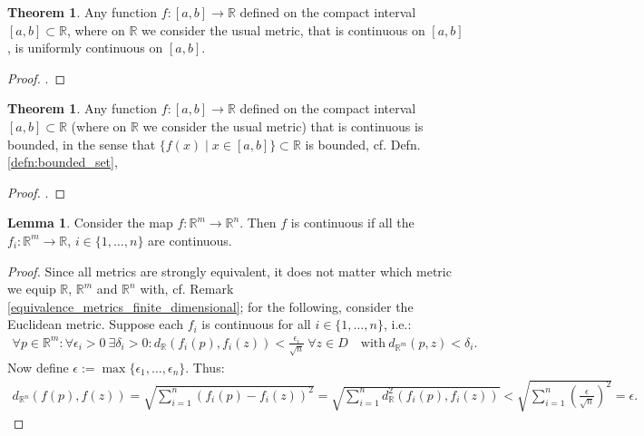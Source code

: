 \documentclass[12pt, a4paper]{article}
\numberwithin{equation}{section}
\theoremstyle{definition}
\theoremstyle{definition}
\newtheorem{lemma}[thm]{Lemma} %
\newtheorem{theorem}[thm]{Theorem}
\begin{document}
	\begin{theorem}\label{thrm:uniform_continuity}
		Any function $f: [a, b]\to\mathbb R$ defined on the compact interval \\ $[a, b] \subset \mathbb R$, where on $\mathbb R$ we consider the usual metric, that is continuous on $[a, b]$, is uniformly continuous on  $[a, b]$.
	\end{theorem}

	\begin{proof}
		\cite[p. 285]{MfPI}.
	\end{proof}

	\begin{theorem}\label{thrm:continuous_functions_bounded_on_compact_interval}
		Any function $f: [a, b]\to\mathbb R$ defined on the compact interval \\ $[a, b] \subset \mathbb R$ (where on $\mathbb R$ we consider the usual metric) that is continuous is bounded, in the sense that $\{ f(x) \mid x\in [a, b] \} \subset \mathbb R$ is bounded, cf. Defn. \ref{defn:bounded_set}, 
	\end{theorem}

	\begin{proof}
		\cite[p. 161]{MfPI}.
	\end{proof}

	\begin{lemma}\label{continuity_vector_components}
		Consider the map $f: \mathbb R^m\rightarrow\mathbb R^n$. Then $f$ is continuous if all the $f_i: \mathbb R^m\rightarrow\mathbb R$, $i\in\{1, \dots, n\}$ are continuous. 
	\end{lemma}
	\begin{proof}
		Since all metrics are strongly equivalent, it does not matter which metric we equip $\mathbb R$, $\mathbb R^m$ and $\mathbb R^n$ with, cf. Remark \ref{equivalence_metrics_finite_dimensional}; for the following, consider the Euclidean metric. Suppose each $f_i$ is continuous for all $i\in \{1, \dots, n\}$, i.e.: 
		\begin{align} 
			\forall p\in\mathbb R^m: \forall \epsilon_i > 0 \ \exists 
			\delta_i>0: d_{\mathbb R}(f_i(p), f_i(z)) < \frac{\epsilon_i}{\sqrt{n}} \ \forall z\in D \quad \text{with}\ d_{\mathbb R^m}(p, z) < \delta_i. 
		\end{align} 
		Now define $\epsilon:= \max\{\epsilon_1, \dots, \epsilon_n\}$. Thus: 
		\begin{align}
			d_{\mathbb R^n}(f(p), f(z)) = \sqrt{\sum_{i=1}^{n}\left(f_i(p)-f_i(z)\right)^2} 
			= \sqrt{\sum_{i=1}^{n}d^2_{\mathbb R}\left(f_i(p), f_i(z)\right)} < \sqrt{\sum_{i=1}^{n}\left(\frac{\epsilon}{\sqrt{n}}\right)^2} = \epsilon. 
		\end{align}
	\end{proof}
	
\end{document}
